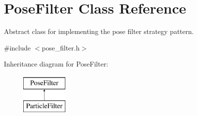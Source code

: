 \hypertarget{classPoseFilter}{\section{Pose\-Filter Class Reference}
\label{classPoseFilter}
}


Abstract class for implementing the pose filter strategy pattern.  




{\ttfamily \#include $<$pose\-\_\-filter.\-h$>$}

Inheritance diagram for Pose\-Filter\-:\begin{figure}[H]
\begin{center}
\leavevmode
\includegraphics[height=2.000000cm]{classPoseFilter}
\end{center}
\end{figure}
